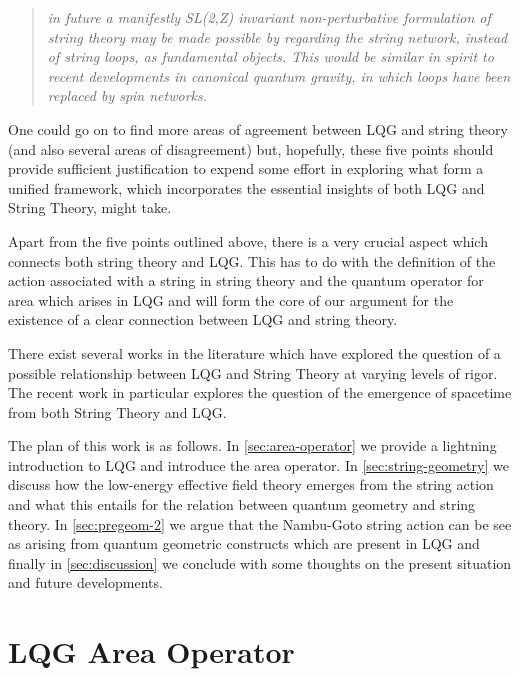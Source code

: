 \documentclass{ws-mpla}
\begin{document}
\begin{enumerate}
	\begin{quote}
		\emph{in future a manifestly SL(2,Z) invariant non-perturbative formulation of string theory may be made possible by regarding the string network, instead of string loops, as fundamental objects. This would be similar in spirit to recent developments in canonical quantum gravity, in which loops have been replaced by spin networks.}
	\end{quote}
\end{enumerate}

One could go on to find more areas of agreement between LQG and string theory (and also several areas of disagreement) but, hopefully, these five points should provide sufficient justification to expend some effort in exploring what form a unified framework, which incorporates the essential insights of both LQG and String Theory, might take.

Apart from the five points outlined above, there is a very crucial aspect which connects both string theory and LQG. This has to do with the definition of the action associated with a string in string theory and the quantum operator for area which arises in LQG and will form the core of our argument for the existence of a clear connection between LQG and string theory.

There exist several works in the literature \cite{Thiemann2004The-LQG-String:,Gambini2014Emergence,Bodendorfer2015A-note,Cai2017The-String,Smolin1998Strings,Freidel2017Loop,Zuo2016A-note,Zuo2017Simplicity} which have explored the question of a possible relationship between LQG and String Theory at varying levels of rigor. The recent work \cite{Huggett2017The-Atemporal} in particular explores the question of the emergence of spacetime from both String Theory and LQG.

The plan of this work is as follows. In \autoref{sec:area-operator} we provide a lightning introduction to LQG and introduce the area operator. In \autoref{sec:string-geometry} we discuss how the low-energy effective field theory emerges from the string action and what this entails for the relation between quantum geometry and string theory. In \autoref{sec:pregeom-2} we argue that the Nambu-Goto string action can be see as arising from quantum geometric constructs which are present in LQG and finally in \autoref{sec:discussion} we conclude with some thoughts on the present situation and future developments.

\section{LQG Area Operator}\label{sec:area-operator}
\end{document}
